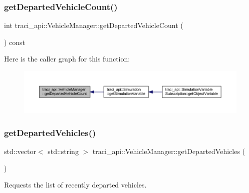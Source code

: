 \subsubsection{\texorpdfstring{get\+Departed\+Vehicle\+Count()}{getDepartedVehicleCount()}}
{\footnotesize\ttfamily int traci\+\_\+api\+::\+Vehicle\+Manager\+::get\+Departed\+Vehicle\+Count (\begin{DoxyParamCaption}{ }\end{DoxyParamCaption}) const}

Here is the caller graph for this function\+:
\nopagebreak
\begin{figure}[H]
\begin{center}
\leavevmode
\includegraphics[width=350pt]{classtraci__api_1_1_vehicle_manager_a707b94f1d1f82a35263ae130a0573f77_icgraph}
\end{center}
\end{figure}
\mbox{\label{classtraci__api_1_1_vehicle_manager_ae88de975fe459842df9a412c552641ea}} 
\subsubsection{\texorpdfstring{get\+Departed\+Vehicles()}{getDepartedVehicles()}}
{\footnotesize\ttfamily std\+::vector$<$ std\+::string $>$ traci\+\_\+api\+::\+Vehicle\+Manager\+::get\+Departed\+Vehicles (\begin{DoxyParamCaption}{ }\end{DoxyParamCaption})}



Requests the list of recently departed vehicles. 

